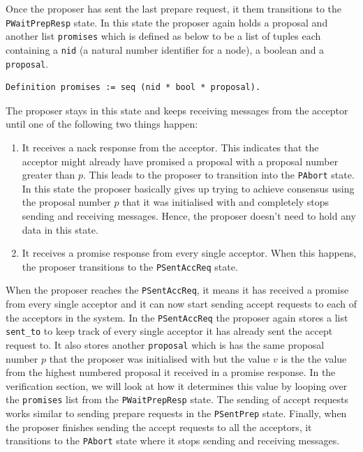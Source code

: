 Once the proposer has sent the last prepare request, it them transitions to
the \texttt{PWaitPrepResp} state. In this state the proposer again holds a proposal and
another list \texttt{promises} which is defined as below to be a list of tuples
each containing a \texttt{nid} (a natural number identifier for a node), a boolean
and a \texttt{proposal}.

\begin{lstlisting}
Definition promises := seq (nid * bool * proposal).
\end{lstlisting}

The proposer stays in this state and keeps receiving messages from the acceptor
until one of the following two things happen:
\begin{enumerate}
  \item It receives a nack response from the acceptor. This indicates that the
    acceptor might already have promised a proposal
    with a proposal number greater than $p$. This leads to the proposer to
    transition into the \texttt{PAbort} state. In this state the proposer basically
    gives up trying to achieve consensus using the proposal number $p$ that it was
    initialised with and completely stops sending and receiving messages. Hence,
    the proposer doesn't need to hold any data in this state.
  \item It receives a promise response from every single acceptor. When this
    happens, the proposer transitions to the \texttt{PSentAccReq} state.
\end{enumerate}

When the proposer reaches the \texttt{PSentAccReq}, it means it has received a promise
from every single acceptor and it can now start sending accept requests to each
of the acceptors in the system. In the \texttt{PSentAccReq} the proposer again stores
a list \texttt{sent\_to} to keep track of every single acceptor it has already sent the
accept request to. It also stores another \texttt{proposal} which is has the same
proposal number $p$ that the proposer was initialised with but the value $v$ is the
the value from the highest numbered proposal it received in a promise response.
In the verification section, we will look at how it determines this value by looping over
the \texttt{promises} list from the \texttt{PWaitPrepResp} state. The sending of
accept requests works similar to sending prepare requests in the
\texttt{PSentPrep} state. Finally, when the proposer finishes sending the
accept requests to all the acceptors, it transitions to the \texttt{PAbort}
state where it stops sending and receiving messages.


